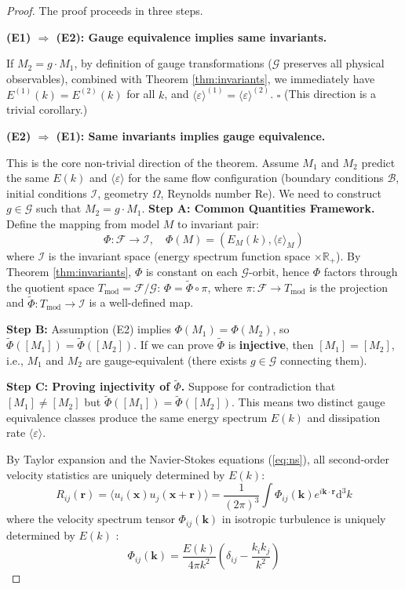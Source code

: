 \documentclass[12pt,a4paper]{article}
\theoremstyle{plain}
\theoremstyle{definition}
\theoremstyle{remark}
\newcommand{\R}{\mathbb{R}}
\newcommand{\F}{\mathcal{F}}
\newcommand{\G}{\mathcal{G}}
\newcommand{\Tmod}{T_{\text{mod}}}
\newcommand{\ReNum}{\mathrm{Re}}
\newcommand{\eps}{\varepsilon}
\newcommand{\diff}{\mathrm{d}}
\newcommand{\avg}[1]{\langle #1 \rangle}
\begin{document}
\begin{proof}
The proof proceeds in three steps.

\textbf{(E1) $\Rightarrow$ (E2): Gauge equivalence implies same invariants.}

If $M_2 = g\cdot M_1$, by definition of gauge transformations ($\G$ preserves all physical observables), combined with Theorem \ref{thm:invariants}, we immediately have $E^{(1)}(k) = E^{(2)}(k)$ for all $k$, and $\avg{\eps}^{(1)} = \avg{\eps}^{(2)}$. $\square$ (This direction is a trivial corollary.)

\textbf{(E2) $\Rightarrow$ (E1): Same invariants implies gauge equivalence.}

This is the core non-trivial direction of the theorem. Assume $M_1$ and $M_2$ predict the same $E(k)$ and $\avg{\eps}$ for the same flow configuration (boundary conditions $\mathcal{B}$, initial conditions $\mathcal{I}$, geometry $\Omega$, Reynolds number $\ReNum$). We need to construct $g\in\G$ such that $M_2 = g\cdot M_1$.
\textbf{Step A: Common Quantities Framework.} Define the mapping from model $M$ to invariant pair:
\begin{equation}
\Phi: \F \to \mathcal{I}, \quad \Phi(M) = (E_M(k), \avg{\eps}_M)
\end{equation}
where $\mathcal{I}$ is the invariant space (energy spectrum function space $\times \R_+$). By Theorem \ref{thm:invariants}, $\Phi$ is constant on each $\G$-orbit, hence $\Phi$ factors through the quotient space $\Tmod = \F/\G$: $\Phi = \tilde{\Phi}\circ\pi$, where $\pi:\F\to\Tmod$ is the projection and $\tilde{\Phi}:\Tmod\to\mathcal{I}$ is a well-defined map.

\textbf{Step B:} Assumption (E2) implies $\Phi(M_1) = \Phi(M_2)$, so $\tilde{\Phi}([M_1]) = \tilde{\Phi}([M_2])$. If we can prove $\tilde{\Phi}$ is \textbf{injective}, then $[M_1] = [M_2]$, i.e., $M_1$ and $M_2$ are gauge-equivalent (there exists $g\in\G$ connecting them).

\textbf{Step C: Proving injectivity of $\tilde{\Phi}$.} Suppose for contradiction that $[M_1]\neq[M_2]$ but $\tilde{\Phi}([M_1])=\tilde{\Phi}([M_2])$. This means two distinct gauge equivalence classes produce the same energy spectrum $E(k)$ and dissipation rate $\avg{\eps}$.

By Taylor expansion and the Navier-Stokes equations (\ref{eq:ns}), all second-order velocity statistics are uniquely determined by $E(k)$:
\begin{equation}
R_{ij}(\mathbf{r}) = \avg{u_i(\mathbf{x})u_j(\mathbf{x}+\mathbf{r})} = \frac{1}{(2\pi)^3}\int \Phi_{ij}(\mathbf{k})e^{i\mathbf{k}\cdot\mathbf{r}}\diff^3k
\end{equation}
where the velocity spectrum tensor $\Phi_{ij}(\mathbf{k})$ in isotropic turbulence is uniquely determined by $E(k)$ \cite{pope2000}:
\begin{equation}
\Phi_{ij}(\mathbf{k}) = \frac{E(k)}{4\pi k^2}\left(\delta_{ij} - \frac{k_i k_j}{k^2}\right)
\end{equation}


\end{proof}
\end{document}
